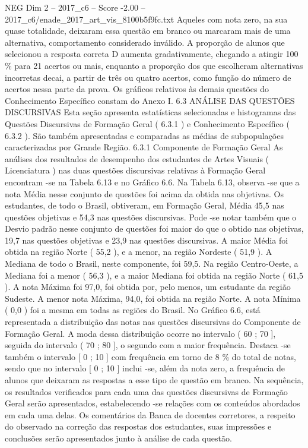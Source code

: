 \begin{textsample}{NEG Dim 2 – 2017\_c6 – Score -2.00 – 2017\_c6/enade\_2017\_art\_vis\_8100b5f9fc.txt}
Aqueles com nota zero, na sua quase totalidade, deixaram essa questão em branco ou marcaram mais de uma alternativa, comportamento considerado inválido.
A proporção de alunos que selecionou a resposta correta D aumenta gradativamente, chegando a atingir 100 \% para 21 acertos ou mais, enquanto a proporção dos que escolheram alternativas incorretas decai, a partir de três ou quatro acertos, como função do número de acertos nessa parte da prova.
Os gráficos relativos às demais questões do Conhecimento Específico constam do Anexo I. 6.3 ANÁLISE DAS QUESTÕES DISCURSIVAS Esta seção apresenta estatísticas selecionadas e histogramas das Questões Discursivas de Formação Geral ( 6.3.1 ) e Conhecimento Específico ( 6.3.2 ).
São também apresentadas e comparadas as médias de subpopulações caracterizadas por Grande Região. 6.3.1 Componente de Formação Geral As análises dos resultados de desempenho dos estudantes de Artes Visuais ( Licenciatura ) nas duas questões discursivas relativas à Formação Geral encontram -se na Tabela 6.13 e no Gráfico 6.6.
Na Tabela 6.13, observa -se que a nota Média nesse conjunto de questões foi acima da obtida nas objetivas.
Os estudantes, de todo o Brasil, obtiveram, em Formação Geral, Média 45,5 nas questões objetivas e 54,3 nas questões discursivas.
Pode -se notar também que o Desvio padrão nesse conjunto de questões foi maior do que o obtido nas objetivas, 19,7 nas questões objetivas e 23,9 nas questões discursivas.
A maior Média foi obtida na região Norte ( 55,2 ), e a menor, na região Nordeste ( 51,9 ).
A Mediana de todo o Brasil, neste componente, foi 59,5.
Na região Centro-Oeste, a Mediana foi a menor ( 56,3 ), e a maior Mediana foi obtida na região Norte ( 61,5 ).
A nota Máxima foi 97,0, foi obtida por, pelo menos, um estudante da região Sudeste.
A menor nota Máxima, 94,0, foi obtida na região Norte.
A nota Mínima ( 0,0 ) foi a mesma em todas as regiões do Brasil.
No Gráfico 6.6, está representada a distribuição das notas nas questões discursivas do Componente de Formação Geral.
A moda dessa distribuição ocorre no intervalo ( 60 ; 70 ], seguida do intervalo ( 70 ; 80 ], o segundo com a maior frequência.
Destaca -se também o intervalo [ 0 ; 10 ] com frequência em torno de 8 \% do total de notas, sendo que no intervalo [ 0 ; 10 ] inclui -se, além da nota zero, a frequência de alunos que deixaram as respostas a esse tipo de questão em branco.
Na sequência, os resultados verificados para cada uma das questões discursivas de Formação Geral serão apresentados, estabelecendo -se relações com os conteúdos abordados em cada uma delas.
Os comentários da Banca de docentes corretores, a respeito do observado na correção das respostas dos estudantes, suas impressões e conclusões serão apresentados junto à análise de cada questão.

\end{textsample}
